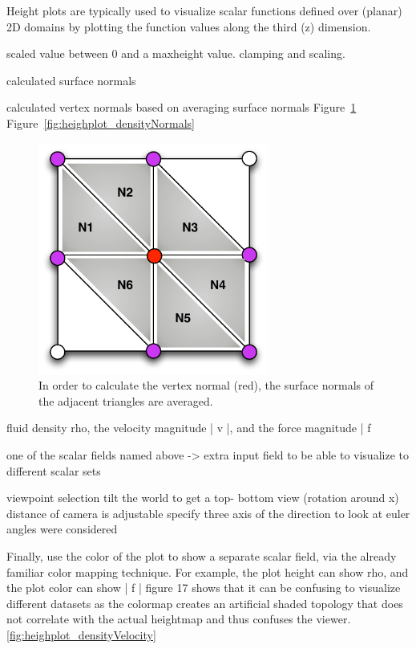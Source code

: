 
 Height plots are typically used to visualize scalar functions defined over (planar) 2D domains by plotting the function values along the third (z) dimension. 
 
 scaled value between 0 and a maxheight value. clamping and scaling. 
 
 
 calculated surface normals 
 
 calculated vertex normals based on averaging surface normals
Figure~\ref{fig:figures_heightplot_normalization}
 Figure~\ref{fig:heighplot_densityNormals}
 \begin{figure}[htbp]
    \centering
        \includegraphics[height=3in]{figures/heightplot/normalization.pdf}
    \caption{In order to calculate the vertex normal (red), the surface normals of the adjacent triangles are averaged.}
    \label{fig:figures_heightplot_normalization}
 \end{figure}
 
 fluid density rho, the velocity magnitude | v |, and the force magnitude | f 
 
 
 
one of the scalar fields named above  -> extra input field to be able to visualize to different scalar sets

viewpoint selection 
tilt the world to get a top- bottom view (rotation around x)
distance of  camera is adjustable
specify three axis of the direction to look at 
euler angles  were considered 


Finally, use the color of the plot to show a separate scalar field, via the already familiar color mapping technique. For example, the plot height can show rho, and the plot color can show | f |
figure 17 shows that it can be confusing to visualize different datasets as the colormap creates an artificial shaded topology that does not correlate with the actual heightmap and thus confuses the viewer. 
\ref{fig:heighplot_densityVelocity}


